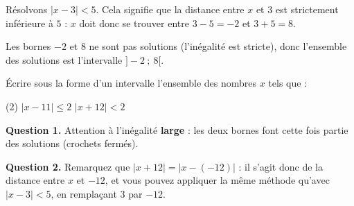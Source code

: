 \documentclass[10pt,a4paper]{article}
\begin{document}
\begin{exple}
    Résolvons \(|x-3|<5\). Cela signifie que la distance entre \(x\) et \(3\) est strictement inférieure à \(5\) : \(x\) doit donc se trouver entre \(3-5=-2\) et \(3+5=8\).

    \vspace{0.3cm}

    Les bornes \(-2\) et \(8\) ne sont pas solutions (l'inégalité est stricte), donc l'ensemble des solutions est l'intervalle \(]-2\ ;\ 8[\).
\end{exple}

\begin{exo}[][]
    Écrire sous la forme d'un intervalle l'ensemble des nombres \(x\) tels que :
    \begin{tasks}(2)
        \task[1.] \(|x-11|\leq 2\)
        \task[2.] \(|x+12|<2\)
    \end{tasks}

    \begin{indication}
        \textbf{Question 1.} Attention à l'inégalité \textbf{large} : les deux bornes font cette fois partie des solutions (crochets fermés).

        \textbf{Question 2.} Remarquez que \(|x+12| = |x-(-12)|\) : il s'agit donc de la distance entre \(x\) et \(-12\), et vous pouvez appliquer la même méthode qu'avec \(|x-3|<5\), en remplaçant \(3\) par \(-12\).
    \end{indication}
\end{exo}
\end{document}

